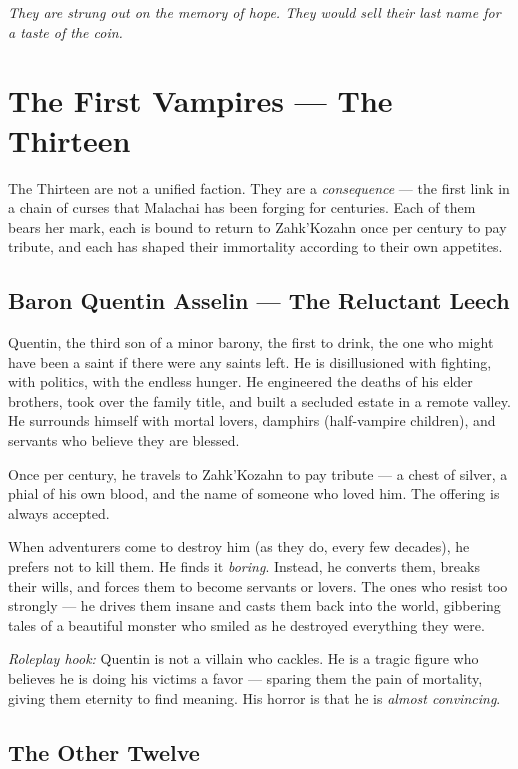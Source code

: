 \documentclass[10pt,twoside]{book}
\begin{document}
\textit{They are strung out on the memory of hope. They would sell their last name for a taste of the coin.}

\chapter{The First Vampires --- The Thirteen}

The Thirteen are not a unified faction. They are a \textit{consequence} --- the first link in a chain of curses that Malachai has been forging for centuries. Each of them bears her mark, each is bound to return to Zahk'Kozahn once per century to pay tribute, and each has shaped their immortality according to their own appetites.

\section{Baron Quentin Asselin --- The Reluctant Leech}

Quentin, the third son of a minor barony, the first to drink, the one who might have been a saint if there were any saints left. He is disillusioned with fighting, with politics, with the endless hunger. He engineered the deaths of his elder brothers, took over the family title, and built a secluded estate in a remote valley. He surrounds himself with mortal lovers, damphirs (half-vampire children), and servants who believe they are blessed.

Once per century, he travels to Zahk'Kozahn to pay tribute --- a chest of silver, a phial of his own blood, and the name of someone who loved him. The offering is always accepted.

When adventurers come to destroy him (as they do, every few decades), he prefers not to kill them. He finds it \textit{boring}. Instead, he converts them, breaks their wills, and forces them to become servants or lovers. The ones who resist too strongly --- he drives them insane and casts them back into the world, gibbering tales of a beautiful monster who smiled as he destroyed everything they were.

\textit{Roleplay hook:} Quentin is not a villain who cackles. He is a tragic figure who believes he is doing his victims a favor --- sparing them the pain of mortality, giving them eternity to find meaning. His horror is that he is \textit{almost convincing}.

\section{The Other Twelve}
\end{document}

